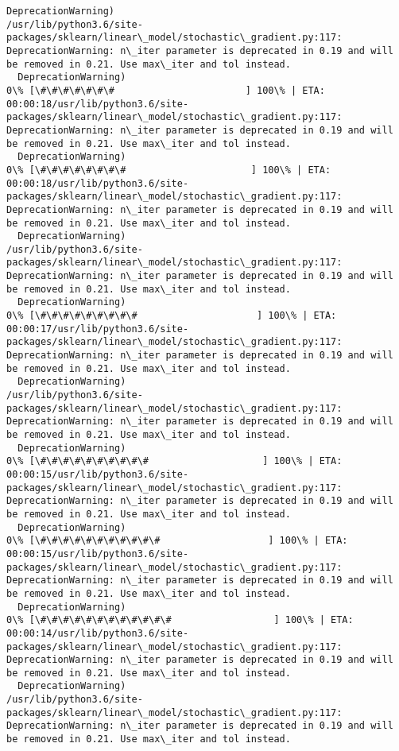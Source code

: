 \documentclass[11pt]{article}
\begin{document}
\begin{Verbatim}[commandchars=\\\{\}]
  DeprecationWarning)
/usr/lib/python3.6/site-packages/sklearn/linear\_model/stochastic\_gradient.py:117: DeprecationWarning: n\_iter parameter is deprecated in 0.19 and will be removed in 0.21. Use max\_iter and tol instead.
  DeprecationWarning)
0\% [\#\#\#\#\#\#\#                       ] 100\% | ETA: 00:00:18/usr/lib/python3.6/site-packages/sklearn/linear\_model/stochastic\_gradient.py:117: DeprecationWarning: n\_iter parameter is deprecated in 0.19 and will be removed in 0.21. Use max\_iter and tol instead.
  DeprecationWarning)
0\% [\#\#\#\#\#\#\#\#                      ] 100\% | ETA: 00:00:18/usr/lib/python3.6/site-packages/sklearn/linear\_model/stochastic\_gradient.py:117: DeprecationWarning: n\_iter parameter is deprecated in 0.19 and will be removed in 0.21. Use max\_iter and tol instead.
  DeprecationWarning)
/usr/lib/python3.6/site-packages/sklearn/linear\_model/stochastic\_gradient.py:117: DeprecationWarning: n\_iter parameter is deprecated in 0.19 and will be removed in 0.21. Use max\_iter and tol instead.
  DeprecationWarning)
0\% [\#\#\#\#\#\#\#\#\#                     ] 100\% | ETA: 00:00:17/usr/lib/python3.6/site-packages/sklearn/linear\_model/stochastic\_gradient.py:117: DeprecationWarning: n\_iter parameter is deprecated in 0.19 and will be removed in 0.21. Use max\_iter and tol instead.
  DeprecationWarning)
/usr/lib/python3.6/site-packages/sklearn/linear\_model/stochastic\_gradient.py:117: DeprecationWarning: n\_iter parameter is deprecated in 0.19 and will be removed in 0.21. Use max\_iter and tol instead.
  DeprecationWarning)
0\% [\#\#\#\#\#\#\#\#\#\#                    ] 100\% | ETA: 00:00:15/usr/lib/python3.6/site-packages/sklearn/linear\_model/stochastic\_gradient.py:117: DeprecationWarning: n\_iter parameter is deprecated in 0.19 and will be removed in 0.21. Use max\_iter and tol instead.
  DeprecationWarning)
0\% [\#\#\#\#\#\#\#\#\#\#\#                   ] 100\% | ETA: 00:00:15/usr/lib/python3.6/site-packages/sklearn/linear\_model/stochastic\_gradient.py:117: DeprecationWarning: n\_iter parameter is deprecated in 0.19 and will be removed in 0.21. Use max\_iter and tol instead.
  DeprecationWarning)
0\% [\#\#\#\#\#\#\#\#\#\#\#\#                  ] 100\% | ETA: 00:00:14/usr/lib/python3.6/site-packages/sklearn/linear\_model/stochastic\_gradient.py:117: DeprecationWarning: n\_iter parameter is deprecated in 0.19 and will be removed in 0.21. Use max\_iter and tol instead.
  DeprecationWarning)
/usr/lib/python3.6/site-packages/sklearn/linear\_model/stochastic\_gradient.py:117: DeprecationWarning: n\_iter parameter is deprecated in 0.19 and will be removed in 0.21. Use max\_iter and tol instead.

\end{Verbatim}
\end{document}
